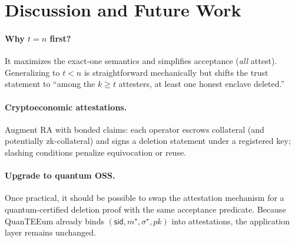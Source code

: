 \documentclass[runningheads,orivec]{llncs}
\newcommand{\prot}{\textsf{QuanTEEum}}
\newcommand{\sid}{\mathsf{sid}}
\begin{document}

\section{Discussion and Future Work}\label{sec:discussion}

\paragraph{Why $t\!=\!n$ first?}
It maximizes the exact-one semantics and simplifies acceptance (\emph{all} attest). Generalizing to $t<n$ is straightforward mechanically but shifts the trust statement to “among the $k\!\ge\!t$ attesters, at least one honest enclave deleted.”

\paragraph{Cryptoeconomic attestations.}
Augment RA with bonded claims: each operator escrows collateral (and potentially zk-collateral) and signs a deletion statement under a registered key; slashing conditions penalize equivocation or reuse. 

\paragraph{Upgrade to quantum OSS.}
Once practical, it should be possible to swap the attestation mechanism for a quantum-certified deletion proof with the same acceptance predicate. Because \prot{} already binds $(\mathsf{sid},m^{\star},\sigma^{\star},pk)$ into attestations, the application layer remains unchanged.
\end{document}
